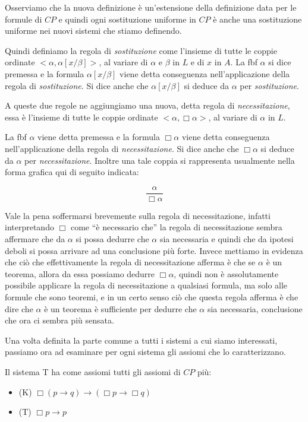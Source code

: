 \documentclass[a4paper, titlepage, 12pt]{report}
\begin{document}
Osserviamo che la nuova definizione è un'estensione della definizione data per le
formule di $CP$ e quindi ogni sostituzione uniforme in $CP$ è anche una sostituzione
uniforme nei nuovi sistemi che stiamo definendo.

Quindi definiamo la regola di \emph{sostituzione} come l'insieme
di tutte le coppie ordinate $<\alpha, \alpha[x/\beta]>$, al variare di
$\alpha$ e $\beta$ in $L$ e di $x$ in $A$.
La fbf $\alpha$ si dice premessa e la formula $\alpha[x/\beta]$ viene detta conseguenza
nell'applicazione della regola di \emph{sostituzione}.
Si dice anche che $\alpha[x/\beta]$ si deduce da $\alpha$ per \emph{sostituzione}.


A queste due regole ne aggiungiamo una nuova, detta regola di \emph{necessitazione},
essa è l'insieme
di tutte le coppie ordinate $<\alpha, \Box \alpha>$,
al variare di $\alpha$ in $L$.

La fbf $\alpha$ viene detta premessa e la formula $\Box \alpha$
viene detta conseguenza nell'applicazione della regola di \emph{necessitazione}.
Si dice anche che $\Box \alpha$ si deduce da $\alpha$
per \emph{necessitazione}.
Inoltre una tale coppia si rappresenta usualmente nella forma grafica qui di seguito indicata:

$$\frac{\alpha}{\Box \alpha}$$

Vale la pena soffermarsi brevemente sulla regola di necessitazione, 
infatti interpretando $\Box$ come ``è necessario che'' la regola di necessitazione
sembra affermare che da $\alpha$ si possa dedurre che $\alpha$ sia necessaria e quindi
che da ipotesi deboli si possa arrivare ad una conclusione più forte.
Invece mettiamo in evidenza che ciò che effettivamente la regola di necessitazione
afferma è che se $\alpha$ è un teorema, allora da essa possiamo dedurre $\Box \alpha$,
quindi non è assolutamente possibile applicare la regola di necessitazione
a qualsiasi formula, ma solo alle formule che sono teoremi, e in un certo senso
ciò che questa regola afferma è che dire che $\alpha$ è un teorema
è sufficiente per dedurre che $\alpha$
sia necessaria, conclusione che ora ci sembra più sensata.


Una volta definita la parte comune a tutti i sistemi a cui siamo interessati,
passiamo ora ad esaminare per ogni sistema gli assiomi che lo caratterizzano.

Il sistema T ha come assiomi tutti gli assiomi di $CP$ più:
\begin{itemize}
\item (K) $\Box (p \rightarrow q) \rightarrow (\Box p \rightarrow \Box q)$
\item (T) $\Box p \rightarrow p$
\end{itemize}
\end{document}
